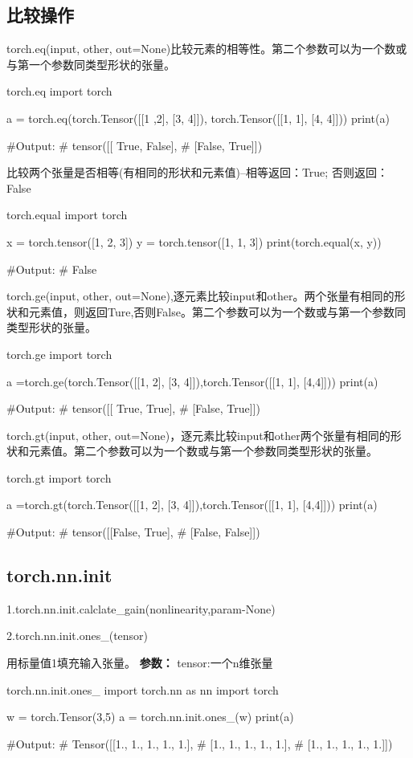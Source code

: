 \documentclass[openbib]{article}
\begin{document}
\subsection{比较操作}
torch.eq(input, other, out=None)比较元素的相等性。第二个参数可以为一个数或与第一个参数同类型形状的张量。
\begin{Python}{torch.eq}
	import torch
	
	a = torch.eq(torch.Tensor([[1 ,2], [3, 4]]), torch.Tensor([[1, 1], [4, 4]]))
	print(a)
	
	#Output:
	#       tensor([[ True, False],
	#               [False,  True]])
\end{Python}

比较两个张量是否相等(有相同的形状和元素值)–相等返回：True; 否则返回：False
\begin{Python}{torch.equal}
	import torch
	
	x = torch.tensor([1, 2, 3])
	y = torch.tensor([1, 1, 3])
	print(torch.equal(x, y))
	
	#Output:
	#       False
\end{Python}
torch.ge(input, other, out=None),逐元素比较input和other。两个张量有相同的形状和元素值，则返回Ture,否则False。第二个参数可以为一个数或与第一个参数同类型形状的张量。
\begin{Python}{torch.ge}
	import torch
	
	a =torch.ge(torch.Tensor([[1, 2], [3, 4]]),torch.Tensor([[1, 1], [4,4]]))
	print(a)
	
	#Output:
	#       tensor([[ True,  True],
	#               [False,  True]])
	
\end{Python}
torch.gt(input, other, out=None)，逐元素比较input和other两个张量有相同的形状和元素值。第二个参数可以为一个数或与第一个参数同类型形状的张量。
\begin{Python}{torch.gt}
	import torch
	
	a =torch.gt(torch.Tensor([[1, 2], [3, 4]]),torch.Tensor([[1, 1], [4,4]]))
	print(a)
	
	#Output:
	#       tensor([[False,  True],
	#               [False, False]])
\end{Python}
\subsection{torch.nn.init}
1.torch.nn.init.calclate\_gain(nonlinearity,param-None)

2.torch.nn.init.ones\_(tensor)

用标量值1填充输入张量。
\textbf{参数：}
tensor:一个n维张量
\begin{Python}{torch.nn.init.ones\_}
import torch.nn as nn
import torch

w = torch.Tensor(3,5)
a = torch.nn.init.ones_(w)
print(a)

#Output:
# Tensor([[1., 1., 1., 1., 1.],
#		  [1., 1., 1., 1., 1.],
#		  [1., 1., 1., 1., 1.]])
\end{Python}
\end{document}
